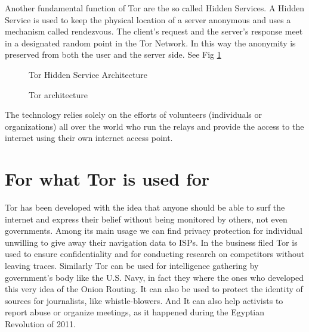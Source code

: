 \documentclass[runningheads,a4paper]{llncs}
\begin{document}
Another fundamental function of Tor are the so called Hidden Services. A Hidden Service is used to keep the physical location of a server anonymous and uses a mechanism called rendezvous. The client's request and the server's response meet in a designated random point in the Tor Network. In this way the anonymity is preserved from both the user and the server side. See Fig \ref{fig:fig_tor_hid}
\begin{figure}[]
        \caption{ Tor Hidden Service Architecture}
        \label{fig:fig_tor_hid}
\end{figure}

\begin{figure}[]
        \caption{ Tor architecture}
        \label{fig:fig_tor_arch}
\end{figure}


The technology relies solely on the efforts of volunteers (individuals or organizations) all over the world who run the relays and provide the access to the internet using their own internet access point.



\section{For what Tor is used for}
Tor has been developed with the idea that anyone should be able to surf the internet and express their belief without being monitored by others, not even governments. Among its main usage we can find privacy protection for individual unwilling to give away their navigation data to ISPs. In the business filed Tor is used to ensure confidentiality and for conducting  research on competitors without leaving traces. Similarly Tor can be used for intelligence gathering by government's body like the U.S. Navy, in fact they where the ones who  developed this very idea of the Onion Routing. It can also be used to protect the identity of sources for journalists, like whistle-blowers. And It can also help activists to report abuse or organize meetings, as it happened during the Egyptian Revolution of 2011. \cite{WASH_715}
\end{document}
